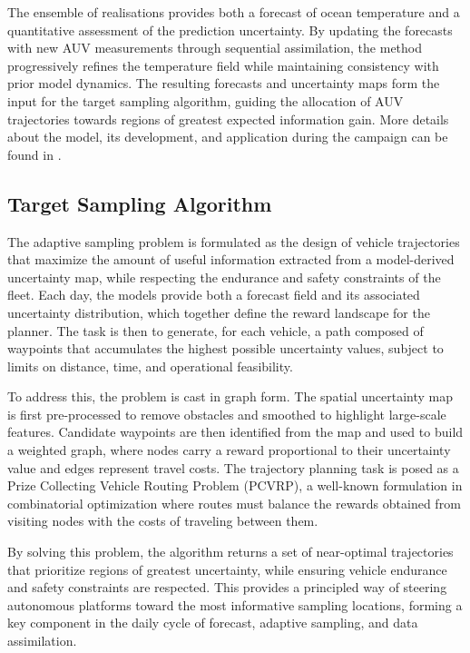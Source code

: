 The ensemble of realisations provides both a forecast of ocean
temperature and a quantitative assessment of the prediction uncertainty.
By updating the forecasts with new AUV measurements through sequential
assimilation, the method progressively refines the temperature field
while maintaining consistency with prior model dynamics. The resulting
forecasts and uncertainty maps form the input for the target sampling
algorithm, guiding the allocation of AUV trajectories towards regions of
greatest expected information gain. More details about the model, its
development, and application during the \proj campaign can be found in
\cite{Duarte2025}.

\subsection{Target Sampling Algorithm}

The adaptive sampling problem is formulated as the design of vehicle
trajectories that maximize the amount of useful information extracted
from a model-derived uncertainty map, while respecting the endurance and
safety constraints of the fleet. Each day, the models provide both a
forecast field and its associated uncertainty distribution, which
together define the reward landscape for the planner. The task is then
to generate, for each vehicle, a path composed of waypoints that
accumulates the highest possible uncertainty values, subject to limits
on distance, time, and operational feasibility.

To address this, the problem is cast in graph form. The spatial
uncertainty map is first pre-processed to remove obstacles and smoothed
to highlight large-scale features. Candidate waypoints are then
identified from the map and used to build a weighted graph, where nodes
carry a reward proportional to their uncertainty value and edges
represent travel costs. The trajectory planning task is posed as a Prize
Collecting Vehicle Routing Problem
(PCVRP)\cite{vidal2013,toth2014vehicle}, a well-known formulation in
combinatorial optimization where routes must balance the rewards
obtained from visiting nodes with the costs of traveling between them.

By solving this problem, the algorithm returns a set of near-optimal
trajectories that prioritize regions of greatest uncertainty, while
ensuring vehicle endurance and safety constraints are respected. This
provides a principled way of steering autonomous platforms toward the
most informative sampling locations, forming a key component in the
daily cycle of forecast, adaptive sampling, and data assimilation.

